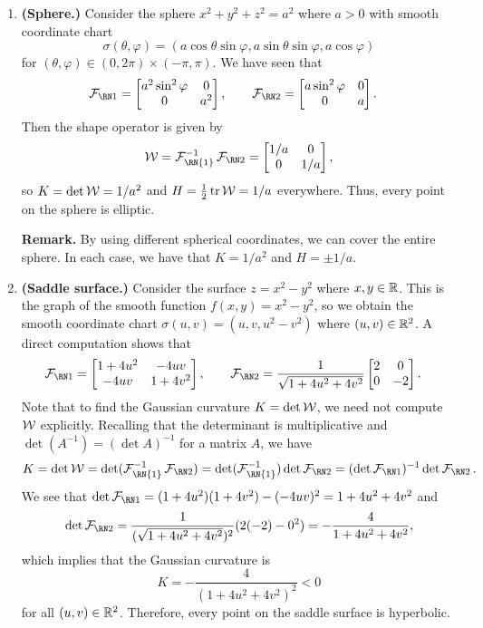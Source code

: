 \begin{enumerate}[(1)]
    \item {\bf (Sphere.)} Consider the sphere $x^2 + y^2 + z^2 = a^2$ where $a > 0$ with 
    smooth coordinate chart 
    \[ \sigma(\theta, \varphi) = (a\cos\theta\sin\varphi, a\sin\theta\sin\varphi, a\cos\varphi) \] 
    for $(\theta, \varphi) \in (0, 2\pi) \times (-\pi, \pi)$. We have seen that 
    \begin{align*}
        \FFF &= \begin{bmatrix}
            a^2\sin^2\varphi & 0 \\ 0 & a^2
        \end{bmatrix}, \qquad \SFF = \begin{bmatrix}
            a\sin^2\varphi & 0 \\ 0 & a 
        \end{bmatrix}.
    \end{align*}
    Then the shape operator is given by 
    \[ {\cal W} = {\cal F}_{\text{\RN{1}}}^{-1} \SFF = \begin{bmatrix}
        1/a & 0 \\ 0 & 1/a
    \end{bmatrix}, \]
    so $K = \det{\cal W} = 1/a^2$ and $H = \frac12\operatorname{tr}{\cal W} = 1/a$ 
    everywhere. Thus, every point on the sphere is elliptic.

    {\bf Remark.} By using different spherical coordinates, we can cover the 
    entire sphere. In each case, we have that $K = 1/a^2$ and $H = \pm1/a$. 

    \item {\bf (Saddle surface.)} Consider the surface $z = x^2 - y^2$ where 
    $x, y \in \mathbb{R}$. This is the graph of the smooth function $f(x, y) = x^2 - y^2$, 
    so we obtain the smooth coordinate chart $\sigma(u, v) = (u, v, u^2 - v^2)$ 
    where $(u, v) \in \mathbb{R}^2$. A direct computation shows that 
    \begin{align*}
        \FFF &= \begin{bmatrix}
            1+4u^2 & -4uv \\ -4uv & 1+4v^2
        \end{bmatrix}, \qquad \SFF = \frac{1}{\sqrt{1+4u^2+4v^2}} \begin{bmatrix}
            2 & 0 \\ 0 & -2
        \end{bmatrix}.
    \end{align*}
    Note that to find the Gaussian curvature $K = \det{\cal W}$, we need not compute ${\cal W}$ 
    explicitly. Recalling that the determinant is multiplicative and 
    $\det(A^{-1}) = (\det A)^{-1}$ for a matrix $A$, we have 
    \[ K = \det{\cal W} = \det({\cal F}_{\text{\RN{1}}}^{-1} \SFF) 
    = \det({\cal F}_{\text{\RN{1}}}^{-1}) \det\SFF = (\det \FFF)^{-1} \det\SFF. \]
    We see that $\det\FFF = (1+4u^2)(1+4v^2) - (-4uv)^2 = 1 + 4u^2 + 4v^2$ and 
    \[ \det\SFF = \frac{1}{(\sqrt{1+4u^2+4v^2})^2} (2(-2) - 0^2) = 
    -\frac{4}{1+4u^2+4v^2}, \] 
    which implies that the Gaussian curvature is 
    \[ K = -\frac{4}{(1+4u^2+4v^2)^2} < 0 \] 
    for all $(u, v) \in \mathbb{R}^2$. Therefore, every point on the saddle surface is hyperbolic.
    
\end{enumerate}

